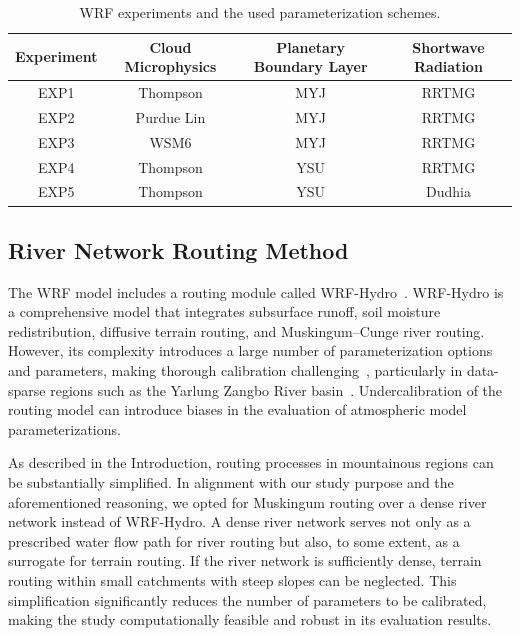 \documentclass[draft]{agujournal2019}
\begin{document}
\begin{table}[h!]
  \doublerulesep 0.3pt
  \renewcommand{\arraystretch}{1}  %
  \caption{WRF experiments and the used parameterization schemes.}\label{tab:wrf_experiment}
  \vspace*{5mm}
  \begin{tabular*}{140mm}{cccc}
    \hline
    Experiment & Cloud Microphysics & Planetary Boundary Layer & Shortwave Radiation \\
    \hline
    EXP1 & Thompson & MYJ & RRTMG \\
    EXP2 & Purdue Lin & MYJ & RRTMG \\
    EXP3 & WSM6 & MYJ & RRTMG \\
    EXP4 & Thompson & YSU & RRTMG \\
    EXP5 & Thompson & YSU & Dudhia \\
    \hline
  \end{tabular*}
  \renewcommand{\arraystretch}{1}  %
\end{table}

\subsection{River Network Routing Method}

The WRF model includes a routing module called WRF-Hydro~\cite{lin2018EMS, givati2016H}. WRF-Hydro is a comprehensive model that integrates subsurface runoff, soil moisture redistribution, diffusive terrain routing, and Muskingum--Cunge river routing. However, its complexity introduces a large number of parameterization options and parameters, making thorough calibration challenging~\cite{rafieeinasab2025WRR}, particularly in data-sparse regions such as the Yarlung Zangbo River basin~\cite{lei2025JH}. Undercalibration of the routing model can introduce biases in the evaluation of atmospheric model parameterizations.

As described in the Introduction, routing processes in mountainous regions can be substantially simplified. In alignment with our study purpose and the aforementioned reasoning, we opted for Muskingum routing over a dense river network instead of WRF-Hydro. A dense river network serves not only as a prescribed water flow path for river routing but also, to some extent, as a surrogate for terrain routing. If the river network is sufficiently dense, terrain routing within small catchments with steep slopes can be neglected. This simplification significantly reduces the number of parameters to be calibrated, making the study computationally feasible and robust in its evaluation results.
\end{document}
